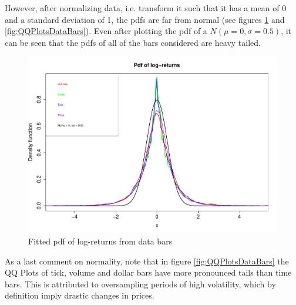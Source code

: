 However, after normalizing data, i.e. transform it such that it has a 
mean of 0 and a standard deviation of 1, the pdfs are far from normal (see 
figures \ref{fig:pdfLogReturns} and \ref{fig:QQPlotsDataBars}). Even after 
plotting the pdf of a $N(\mu = 0, \sigma = 0.5)$, it can be seen that the 
pdfs of all of the bars considered are heavy tailed.

\begin{figure}[htbp]
	\centering
	\includegraphics[scale=.35]{img/dataBars/pdfLogReturns}
	\caption{Fitted pdf of log-returns from data bars}
	\label{fig:pdfLogReturns}
\end{figure}

As a last comment on normality, note that in figure 
\ref{fig:QQPlotsDataBars} the QQ Plots of tick, volume and dollar bars have 
more pronounced tails than time bars. This is attributed to oversampling 
periods of high volatility, which by definition imply drastic changes in 
prices.

